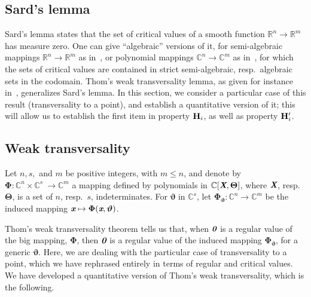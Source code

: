 \documentclass[a4paper]{article}
\def\bz{\textit{\textbf{0}}}
\def\Xb{\textit{\textbf{X}}}
\def\Thetab{\bm{\Theta}}
\def\thetab{\bm{\vartheta}}
\def\xb{\textit{\textbf{x}}}
\def\vt{\vartheta}
\def\dt{s}
\def\C{\mathbb{C}}
\def\R{\mathbb{R}}
\begin{document}
\subsection{Sard's lemma}
Sard's lemma states that the set of critical values of a smooth
function $\R^n \to \R^m$ has measure zero. One can give ``algebraic''
versions of it, for semi-algebraic mappings $\R^n \to \R^m$ as
in~\cite[Chapter~9]{bochnak1998real}, or polynomial mappings $\C^n \to
\C^m$ as in~\cite[Chapter~3]{Mumford76}, for which the sets of
critical values are contained in strict semi-algebraic,
resp.\ algebraic sets in the codomain. Thom's weak transversality
lemma, as given for instance in~\cite{demazure2000bifurcations},
generalizes Sard's lemma. In this section, we consider a particular
case of this result (transversality to a point), and establish a
quantitative version of it; this will allow us to establish the first
item in property ${\bf H}_i$, as well as property ${\bf H}'_i$. 


\subsection{Weak transversality}
Let $n,\dt,$ and $m$ be positive integers, with $m \le n$, and denote
by $\bm\Phi :\C^n \times \C^{\dt} ~ \rightarrow \C^{m}$ a mapping
defined by polynomials in $\C[\Xb,\Thetab]$, where $\Xb$,
resp.\ $\Thetab$, is a set of $n$, resp.\ $\dt$, indeterminates.  For
$\thetab$ in $\C^{\dt}$, let $\bm\Phi_{\thetab} : \C^n \rightarrow
\C^{m}$ be the induced mapping $\xb\mapsto \bm\Phi(\xb,\thetab)$.  

Thom’s weak transversality theorem tells us that, when $\bz$ is a regular value of the big mapping, $\bm \Phi$, then $\bz$ is a regular value of the induced mapping $\bm \Phi_{\bm \vt}$, for a generic $\bm \vt$. Here, we are dealing with the particular case of transversality to a point, which we have rephrased entirely in terms of regular and critical values. We have developed a quantitative version of Thom’s weak transversality, which is the following.
\end{document}
